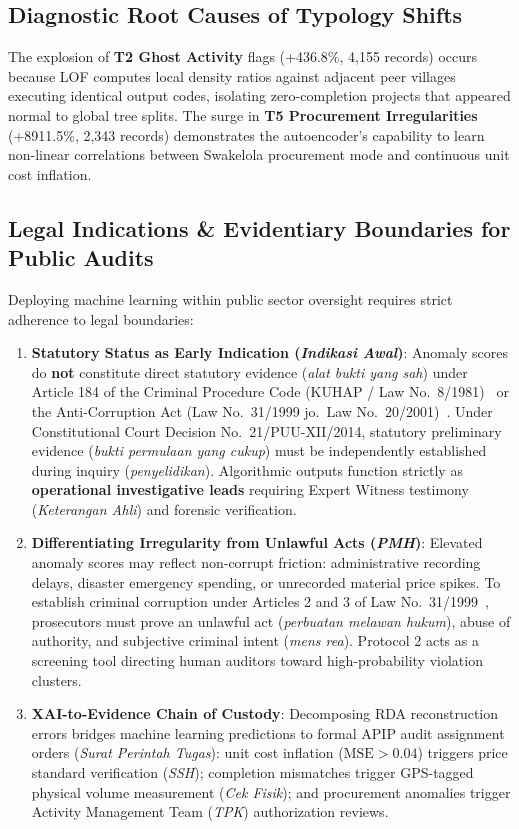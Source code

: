 \documentclass[conference]{IEEEtran}
\begin{document}
\subsection{Diagnostic Root Causes of Typology Shifts}

The explosion of \textbf{T2 Ghost Activity} flags (+436.8\%, 4,155 records) occurs because LOF computes local density ratios against adjacent peer villages executing identical output codes, isolating zero-completion projects that appeared normal to global tree splits. The surge in \textbf{T5 Procurement Irregularities} (+8911.5\%, 2,343 records) demonstrates the autoencoder's capability to learn non-linear correlations between Swakelola procurement mode and continuous unit cost inflation.

\subsection{Legal Indications \& Evidentiary Boundaries for Public Audits}

Deploying machine learning within public sector oversight requires strict adherence to legal boundaries:
\begin{enumerate}
    \item \textbf{Statutory Status as Early Indication (\textit{Indikasi Awal})}: Anomaly scores do \textbf{not} constitute direct statutory evidence (\textit{alat bukti yang sah}) under Article 184 of the Criminal Procedure Code (KUHAP / Law No.\ 8/1981)~\cite{ref35} or the Anti-Corruption Act (Law No.\ 31/1999 jo.\ Law No.\ 20/2001)~\cite{ref34}. Under Constitutional Court Decision No.\ 21/PUU-XII/2014, statutory preliminary evidence (\textit{bukti permulaan yang cukup}) must be independently established during inquiry (\textit{penyelidikan}). Algorithmic outputs function strictly as \textbf{operational investigative leads} requiring Expert Witness testimony (\textit{Keterangan Ahli}) and forensic verification.
    \item \textbf{Differentiating Irregularity from Unlawful Acts (\textit{PMH})}: Elevated anomaly scores may reflect non-corrupt friction: administrative recording delays, disaster emergency spending, or unrecorded material price spikes. To establish criminal corruption under Articles 2 and 3 of Law No.\ 31/1999~\cite{ref34}, prosecutors must prove an unlawful act (\textit{perbuatan melawan hukum}), abuse of authority, and subjective criminal intent (\textit{mens rea}). Protocol 2 acts as a screening tool directing human auditors toward high-probability violation clusters.
    \item \textbf{XAI-to-Evidence Chain of Custody}: Decomposing RDA reconstruction errors bridges machine learning predictions to formal APIP audit assignment orders (\textit{Surat Perintah Tugas}): unit cost inflation ($\text{MSE} > 0.04$) triggers price standard verification (\textit{SSH}); completion mismatches trigger GPS-tagged physical volume measurement (\textit{Cek Fisik}); and procurement anomalies trigger Activity Management Team (\textit{TPK}) authorization reviews.
\end{enumerate}
\end{document}
